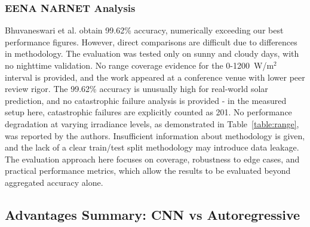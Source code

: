 \documentclass[journal]{IEEEtran}
\begin{document}
\subsubsection{EENA NARNET Analysis}
Bhuvaneswari et al. \cite{ref12} obtain 99.62\% accuracy, numerically exceeding our best performance figures. However, direct comparisons are difficult due to differences in methodology. The evaluation was tested only on sunny and cloudy days, with no nighttime validation. No range coverage evidence for the 0-1200~W/m$^2$ interval is provided, and the work appeared at a conference venue with lower peer review rigor. The 99.62\% accuracy is unusually high for real-world solar prediction, and no catastrophic failure analysis is provided - in the measured setup here, catastrophic failures are explicitly counted as 201. No performance degradation at varying irradiance levels, as demonstrated in Table~\ref{table:range}, was reported by the authors. Insufficient information about methodology is given, and the lack of a clear train/test split methodology may introduce data leakage. The evaluation approach here focuses on coverage, robustness to edge cases, and practical performance metrics, which allow the results to be evaluated beyond aggregated accuracy alone.

\subsection{Advantages Summary: CNN vs Autoregressive}

\begin{table}[!htbp]
\caption{Detailed Comparison of CNN vs Autoregressive Approaches}
\label{table:cnn_vs_ar}
\centering
\small
{}
\end{table}
\end{document}
